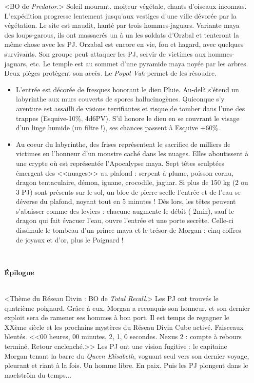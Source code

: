 \documentclass[11pt,twoside,a4paper]{book}
\begin{document}
<BO de \emph{Predator}.> Soleil mourant, moiteur v{\'e}g{\'e}tale, chants d'oiseaux inconnus. L'exp{\'e}dition progresse lentement jusqu'aux vestiges d'une ville d{\'e}vor{\'e}e par la v{\'e}g{\'e}tation. Le site est maudit, hant{\'e} par trois hommes-jaguars. Variante maya des loups-garous, ils ont massacr{\'e}s un {\`a} un les soldats d'Orzbal et tenteront la m{\^e}me chose avec les PJ. Orzabal est encore en vie, fou et hagard, avec quelques survivants. Son groupe peut attaquer les PJ, servir de victimes aux hommes-jaguars, etc. Le temple est au sommet d'une pyramide maya noy{\'e}e par les arbres. Deux pi{\`e}ges prot{\`e}gent son acc{\`e}s. Le \emph{Popol Vuh} permet de les r{\'e}soudre.~\\

\setlength\parindent{20pt}
\begin{itemize}
	\item L'entr{\'e}e est d{\'e}cor{\'e}e de fresques honorant le dieu Pluie. Au-del{\`a} s'{\'e}tend un labyrinthe aux murs couverts de spores hallucinog{\`e}nes. Quiconque s'y aventure est assailli de visions terrifiantes et risque de tomber dans l'une des trappes (Esquive-10\%, 4d6PV). S'il honore le dieu en se couvrant le visage d'un linge humide (un filtre !), ses chances passent {\`a} Esquive +60\%.
	\item Au coeur du labyrinthe, des frises repr{\'e}sentent le sacrifice de milliers de victimes en l'honneur d'un monstre cach{\'e} dans les nuages. Elles aboutissent {\`a} une crypte o{\`u} est repr{\'e}sent{\'e}e l'Apocalypse maya. Sept t{\^e}tes sculpt{\'e}es {\'e}mergent des <<nuages>> au plafond : serpent {\`a} plume, poisson cornu, dragon tentaculaire, d{\'e}mon, iguane, crocodile, jaguar. Si plus de 150 kg (2 ou 3 PJ) sont pr{\'e}sents sur le sol, un bloc de pierre scelle l'entr{\'e}e et de l'eau se d{\'e}verse du plafond, noyant tout en 5 minutes ! D{\`e}s lors, les t{\^e}tes peuvent s'abaisser comme des leviers : chacune augmente le d{\'e}bit (-2min), sauf le dragon qui fait {\'e}vacuer l'eau, ouvre l'entr{\'e}e et une porte secr{\`e}te. Celle-ci dissimule le tombeau d'un prince maya et le tr{\'e}sor de Morgan : cinq coffres de joyaux et d'or, plus le Poignard !
\end{itemize}~\\
\setlength\parindent{0pt}

\textbf{\Large {\'E}pilogue}~\\\

<Th{\`e}me du R{\'e}seau Divin : BO de \emph{Total Recall}.> Les PJ ont trouv{\'e}s le quatri{\`e}me poignard. Gr{\^a}ce {\`a} eux, Morgan a reconquis son honneur, et son dernier exploit sera de ramener ses hommes {\`a} bon port. Il est temps de regagner le XX{\`e}me si{\`e}cle et les prochains myst{\`e}res du R{\'e}seau Divin Cube activ{\'e}. Faisceaux bleut{\'e}s. <<00 heures, 00 minutes, 2, 1, 0 secondes. Nexus 2 : compte {\`a} rebours termin{\'e}. Retour enclench{\'e}.>> Les PJ ont une vision fugitive : le capitaine Morgan tenant la barre du \emph{Queen Elisabeth}, voguant seul vers son dernier voyage, pleurant et riant {\`a} la fois. Un homme libre. En paix. Puis les PJ plongent dans le maelstr{\"o}m du temps...~\\
\end{document}
